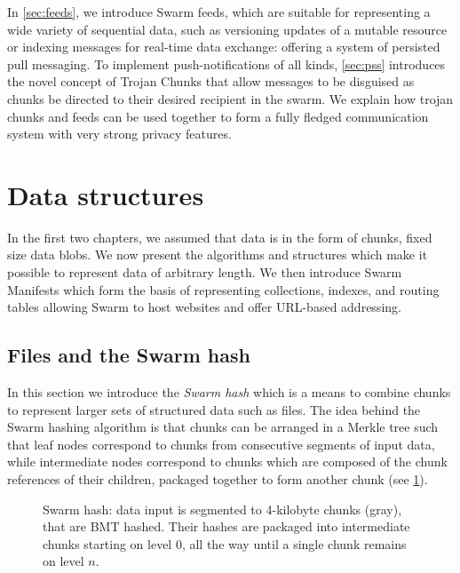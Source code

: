 In \ref{sec:feeds}, we introduce Swarm feeds, which are suitable for representing a wide variety of sequential data, such as versioning updates of a mutable resource or indexing messages for real-time data exchange: offering a system of persisted pull messaging. To implement push-notifications of all kinds, \ref{sec:pss} introduces the novel concept of Trojan Chunks that allow messages to be disguised as chunks be directed to their desired recipient in the swarm. We explain how trojan chunks and feeds can be used together to form a fully fledged communication system with very strong privacy features.                                                       

\section{Data structures\statusgreen}\label{sec:datastructures}

\green{}

In the first two chapters, we assumed that data is in the form of chunks, fixed size data blobs. We now present the algorithms and structures which make it possible to represent data of arbitrary length. We then introduce Swarm Manifests which form the basis of representing collections, indexes, and routing tables allowing Swarm to host websites and offer URL-based addressing.

\subsection{Files and the Swarm hash\statusgreen}\label{sec:files}

In this section we introduce the \emph{Swarm hash} which is a means to combine chunks to represent larger sets of structured data such as files. The idea behind the Swarm hashing algorithm is that chunks can be arranged in a Merkle tree such that leaf nodes correspond to chunks from consecutive segments of input data, while intermediate nodes correspond to chunks which are composed of the chunk references of their children,  packaged together to form another chunk (see \ref{fig:Swarm-hash}). 



\begin{figure}[htbp]
\centering
\resizebox{1\textwidth}{!}{
    
}
\caption[Swarm hash \statusgreen]{Swarm hash: data input is segmented to 4-kilobyte chunks (gray), that are BMT hashed. Their hashes are packaged into intermediate chunks starting on level $0$, all the way until a single chunk remains on level $n$. }
\label{fig:Swarm-hash}
\end{figure}

